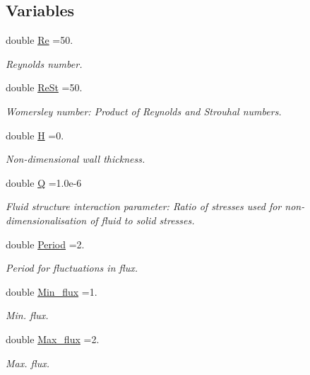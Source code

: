\subsection*{Variables}
\begin{DoxyCompactItemize}
\item 
double \hyperlink{namespaceGlobal__Physical__Variables_ab814e627d2eb5bc50318879d19ab16b9}{Re} =50.
\begin{DoxyCompactList}\small\item\em Reynolds number. \end{DoxyCompactList}\item 
double \hyperlink{namespaceGlobal__Physical__Variables_a085ee4bf968ffdd01a41b8c41864f907}{Re\+St} =50.
\begin{DoxyCompactList}\small\item\em Womersley number\+: Product of Reynolds and Strouhal numbers. \end{DoxyCompactList}\item 
double \hyperlink{namespaceGlobal__Physical__Variables_af6e07423e22c0991084d9a2f43727805}{H} =0.
\begin{DoxyCompactList}\small\item\em Non-\/dimensional wall thickness. \end{DoxyCompactList}\item 
double \hyperlink{namespaceGlobal__Physical__Variables_a66cb7ecda9ba0cd72367dd697f154545}{Q} =1.\+0e-\/6
\begin{DoxyCompactList}\small\item\em Fluid structure interaction parameter\+: Ratio of stresses used for non-\/dimensionalisation of fluid to solid stresses. \end{DoxyCompactList}\item 
double \hyperlink{namespaceGlobal__Physical__Variables_a2ffa220a56bff9b6b495ed47954d513f}{Period} =2.
\begin{DoxyCompactList}\small\item\em Period for fluctuations in flux. \end{DoxyCompactList}\item 
double \hyperlink{namespaceGlobal__Physical__Variables_aa46dc81a0757e8f9707646e03c32d4fc}{Min\+\_\+flux} =1.
\begin{DoxyCompactList}\small\item\em Min. flux. \end{DoxyCompactList}\item 
double \hyperlink{namespaceGlobal__Physical__Variables_aee645139728fd3d01573b161c74e7e8a}{Max\+\_\+flux} =2.
\begin{DoxyCompactList}\small\item\em Max. flux. \end{DoxyCompactList}\end{DoxyCompactItemize}


